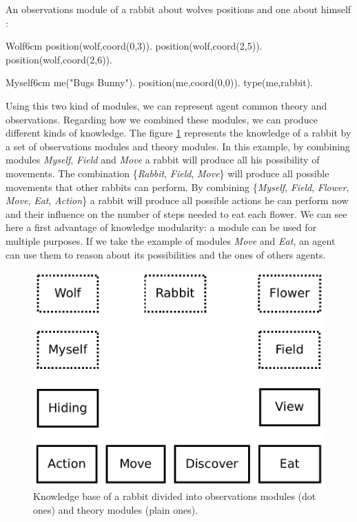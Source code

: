 \documentclass{aamas2012}
\begin{document}
	\begin{example}
		An observations module of a rabbit about wolves positions and one about himself :\newline
		\begin{module}{Wolf}{6cm}
			position(wolf,coord(0,3)).\newline
			position(wolf,coord(2,5)).\newline
			position(wolf,coord(2,6)).
		\end{module}
		
		\begin{module}{Myself}{6cm}
			me("Bugs Bunny").\newline
			position(me,coord(0,0)).\newline
			type(me,rabbit).
		\end{module}
	\end{example}

	Using this two kind of modules, we can represent agent common theory and observations.
	Regarding how we combined these modules, we can produce different kinds of knowledge.
	The figure \ref{module_combination} represents the knowledge of a rabbit by a set of observations modules and theory modules.
	In this example, by combining modules \emph{Myself}, \emph{Field} and \emph{Move} a rabbit will produce all his possibility of movements.
	The combination \{\emph{Rabbit}, \emph{Field}, \emph{Move}\} will produce all possible movements that other rabbits can perform. 
	By combining \{\emph{Myself}, \emph{Field}, \emph{Flower}, \emph{Move}, \emph{Eat}, \emph{Action}\} 
	a rabbit will produce all possible actions he can perform now and their influence on the number of steps needed to eat each flower.
	We can see here a first advantage of knowledge modularity: a module can be used for multiple purposes.
	If we take the example of modules \emph{Move} and \emph{Eat}, an agent can use them to reason about its possibilities and the ones of others agents.
	
	\begin{figure}
		\centering
		\includegraphics[keepaspectratio=true, scale=0.4]{module_combination.pdf}
		\caption
		{
			\label{module_combination}
			Knowledge base of a rabbit divided into observations modules (dot ones) and theory modules (plain ones).
		}
	\end{figure}
\end{document}
